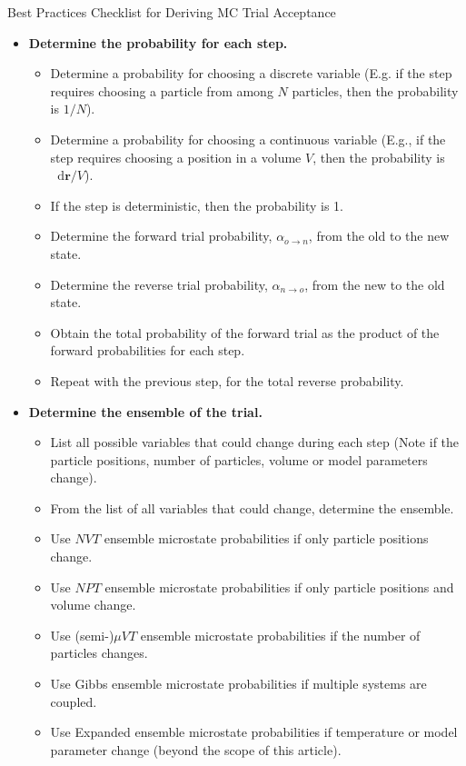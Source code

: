 \documentclass[
  9pt,
  bestpractices,
  pubversion,
]{livecoms}
\newcommand*\diff{\mathop{}\!\mathrm{d}}
\begin{document}
\begin{Checklists*}[p!]
\begin{checklist}{Best Practices Checklist for Deriving MC Trial Acceptance}
\begin{itemize}
\item
  \textbf{Determine the probability for each step.}
  \begin{itemize}
    \item Determine a probability for choosing a discrete variable (E.g. if the step requires choosing a particle from among $N$ particles, then the probability is $1/N$).
    \item Determine a probability for choosing a continuous variable (E.g., if the step requires choosing a position in a volume $V$, then the probability is $\diff\mathbf{r}/V$).
    \item If the step is deterministic, then the probability is 1.
    \item Determine the forward trial probability, $\alpha_{o \rightarrow n}$, from the old to the new state.
    \item Determine the reverse trial probability, $\alpha_{n \rightarrow o}$, from the new to the old state.
    \item Obtain the total probability of the forward trial as the product of the forward probabilities for each step.
    \item Repeat with the previous step, for the total reverse probability.
  \end{itemize}

\item
  \textbf{Determine the ensemble of the trial.}
  \begin{itemize}
    \item List all possible variables that could change during each step (Note if the particle positions, number of particles, volume or model parameters change).
    \item From the list of all variables that could change, determine the ensemble.
    \item Use $NVT$ ensemble microstate probabilities if only particle positions change.
    \item Use $NPT$ ensemble microstate probabilities if only particle positions and volume change.
    \item Use (semi-)$\mu VT$ ensemble microstate probabilities if the number of particles changes.
    \item Use Gibbs ensemble microstate probabilities if multiple systems are coupled.
    \item Use Expanded ensemble microstate probabilities if temperature or model parameter change (beyond the scope of this article).
  \end{itemize}


\end{itemize}
\end{checklist}
\end{Checklists*}
\end{document}

